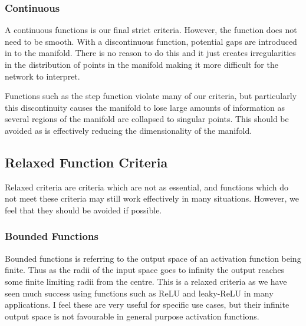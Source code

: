 \documentclass[onecolumn]{article}
\begin{document}
    

    \subsubsection{Continuous}
    
    A continuous functions is our final strict criteria. However, the function does not need to be smooth. With a discontinuous function, potential gaps are introduced in to the manifold. There is no reason to do this and it just creates irregularities in the distribution of points in the manifold making it more difficult for the network to interpret.
    
    Functions such as the step function violate many of our criteria, but particularly this discontinuity causes the manifold to lose large amounts of information as several regions of the manifold are collapsed to singular points. This should be avoided as is effectively reducing the dimensionality of the manifold.


    \subsection{Relaxed Function Criteria}
        
    Relaxed criteria are criteria which are not as essential, and functions which do not meet these criteria may still work effectively in many situations. However, we feel that they should be avoided if possible.
        
    \subsubsection{Bounded Functions}
        
    Bounded functions is referring to the output space of an activation function being finite. Thus as the radii of the input space goes to infinity the output reaches some finite limiting radii from the centre. This is a relaxed criteria as we have seen much success using functions such as ReLU and leaky-ReLU in many applications. I feel these are very useful for specific use cases, but their infinite output space is not favourable in general purpose activation functions.
    
\end{document}
